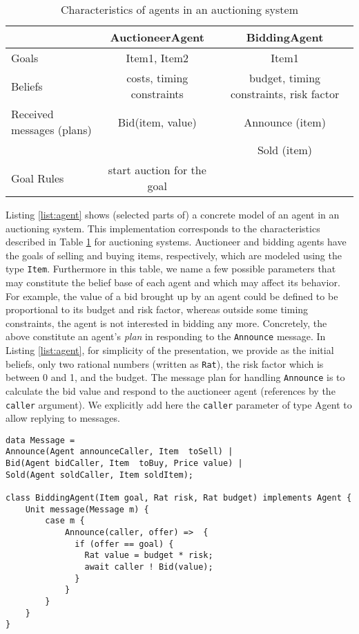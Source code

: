 




\begin{table}
	\caption{Characteristics of agents in an auctioning system}\label{tab:auc}
\begin{tabular}{|l|c|c|}
	\hline
	& AuctioneerAgent & BiddingAgent \\
	\hline
Goals & Item1, Item2 & Item1 \\
Beliefs & costs, timing constraints & budget, timing constraints, risk factor \\	
Received messages (plans) & Bid(item, value) & Announce (item) \\
 & & Sold (item) \\
Goal Rules & start auction for the goal & \\
\hline
\end{tabular}
\end{table}



Listing \ref{list:agent} shows (selected parts of) a concrete model of an agent  in an auctioning system.
This implementation corresponds to the characteristics described in Table \ref{tab:auc} for auctioning systems.
Auctioneer and bidding agents have the goals of selling and buying items, respectively, which are modeled using the type \lstinline|Item|. 
Furthermore in this table, we name a few possible parameters that may constitute the belief base of each agent and which may affect its behavior.
For example, the value of a bid brought up by an agent could be defined to be proportional to its budget and risk factor, whereas outside some timing constraints, the agent is not interested in bidding any more. 
Concretely, the above constitute an agent's {\em plan} in responding to the \lstinline|Announce| message.
In Listing \ref{list:agent}, for simplicity of the presentation, we provide as the initial beliefs, only two rational numbers (written as \lstinline|Rat|), the risk factor which is between 0 and 1, and the budget.
The message plan for handling \lstinline|Announce| is to calculate the bid value and respond to the auctioneer agent (references by the \lstinline|caller| argument).
We explicitly add here the \lstinline|caller| parameter of type Agent to allow replying to messages. 


\begin{lstlisting}[caption=Agents in an auctioning system, label=list:agent]
data Message = 
Announce(Agent announceCaller, Item  toSell) | 
Bid(Agent bidCaller, Item  toBuy, Price value) |
Sold(Agent soldCaller, Item soldItem);

class BiddingAgent(Item goal, Rat risk, Rat budget) implements Agent {
	Unit message(Message m) {
		case m {
			Announce(caller, offer) =>  {
			  if (offer == goal) {
			    Rat value = budget * risk;
			    await caller ! Bid(value);
			  } 
			}
		}
	}
}
\end{lstlisting}


